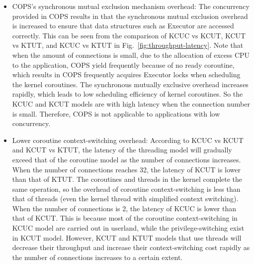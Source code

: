 \documentclass[sigconf,review,anonymous]{acmart}
\begin{document}
\begin{itemize}[leftmargin=*]
\item COPS's synchronous mutual exclusion mechanism overhead: The concurrency provided in COPS results in that the synchronous mutual exclusion overhead is increased to ensure that data structures such as Executor are accessed correctly. This can be seen from the comparison of KCUC vs KCUT, KCUT vs KTUT, and KCUC vs KTUT in Fig.~\ref{fig:throughput-latency}. Note that when the amount of connections is small, due to the allocation of excess CPU to the application, COPS yield frequently because of no ready coroutine, which results in COPS frequently acquires Executor locks when scheduling the kernel coroutines. The synchronous mutually exclusive overhead increases rapidly, which leads to low scheduling efficiency of kernel coroutines. So the KCUC and KCUT models are with high latency when the connection number is small. Therefore, COPS is not applicable to applications with low concurrency.
\item Lower coroutine context-switching overhead: According to KCUC vs KCUT and KCUT vs KTUT, the latency of the threading model will gradually exceed that of the coroutine model as the number of connections increases. When the number of connections reaches 32, the latency of KCUT is lower than that of KTUT. The coroutines and threads in the kernel complete the same operation, so the overhead of coroutine context-switching is less than that of threads (even the kernel thread with simplified context switching). When the number of connections is 2, the latency of KCUC is lower than that of KCUT. This is because most of the coroutine context-switching in KCUC model are carried out in userland, while the privilege-switching exist in KCUT model. However, KCUT and KTUT models that use threads will decrease their throughput and increase their context-switching cost rapidly as the number of connections increases to a certain extent.

\end{itemize}
\end{document}
